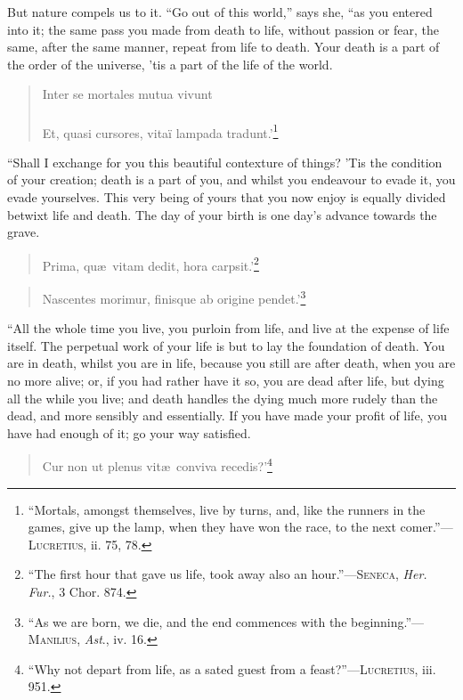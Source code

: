 But nature compels us to it. ``Go out of this world,'' says
she, ``as you entered into it; the same pass you made from death to
life, without passion or fear, the same, after the same manner, repeat
from life to death. Your death is a part of the order of the universe,
'tis a part of the life of the world.

\begin{verse}
\vin {}Inter se mortales mutua vivunt\\
\dotfill\\
Et, quasi cursores, vita\"{i} lampada tradunt.'\footnote{``Mortals,
amongst themselves, live by turns, and, like the runners in the games,
give up the lamp, when they have won the race, to the next
comer.''---\textsc{Lucretius}, ii. 75, 78.}
\end{verse}

``Shall I exchange for you this beautiful contexture of things? 'Tis
the condition of your creation; death is a part of you, and whilst you
endeavour to evade it, you evade yourselves. This very being of yours
that you now enjoy is equally divided betwixt life and death. The day
of your birth is one day's advance towards the grave.

\begin{verse}
Prima, qu\ae\ vitam dedit, hora carpsit.'\footnote{``The
first hour that gave us life, took away also an
hour.''---\textsc{Seneca}, \textit{Her. Fur.}, 3 Chor. 874.}
\end{verse}

\begin{verse}
Nascentes morimur, finisque ab origine
pendet.'\footnote{``As we are born, we die, and the end commences with
the beginning.''---\textsc{Manilius}, \textit{Ast}., iv. 16.}
\end{verse}

\noindent ``All the whole time you live, you purloin from life, and
live at the expense of life itself. The perpetual work of your life is
but to lay the foundation of death. You are in death, whilst you are
in life, because you still are after death, when you are no more
alive; or, if you had rather have it so, you are dead after life, but
dying all the while you live; and death handles the dying much more
rudely than the dead, and more sensibly and essentially. If you have
made your profit of life, you have had enough of it; go your way
satisfied.

\begin{verse}
Cur non ut plenus vit\ae\ conviva recedis?'\footnote{``Why
not depart from life, as a sated guest from a
feast?''---\textsc{Lucretius}, iii. 951.}
\end{verse}

